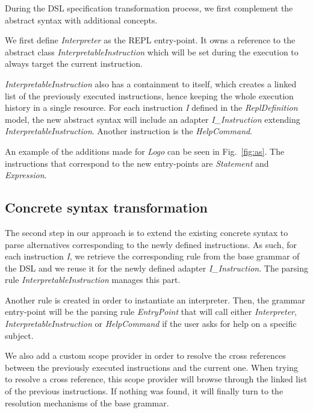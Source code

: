 During the DSL specification transformation process, we first complement the abstract syntax with additional concepts.

We first define \textit{Interpreter} as the REPL entry-point. It owns a reference to the abstract class \textit{InterpretableInstruction} which will be set during the execution to always target the current instruction.

\textit{InterpretableInstruction} also has a containment to itself, which creates a linked list of the previously executed instructions, hence keeping the whole execution history in a single resource.
For each instruction \textit{I} defined in the \emph{ReplDefinition} model, the new abstract syntax will include an adapter \textit{I\_Instruction} extending \textit{InterpretableInstruction}.
Another instruction is the \textit{HelpCommand}.

An example of the additions made for \textit{Logo} can be seen in Fig.~\ref{fig:as}.
The instructions that correspond to the new entry-points are \textit{Statement} and \textit{Expression}.

\subsection{Concrete syntax transformation}

The second step in our approach is to extend the existing concrete syntax to parse alternatives corresponding to the newly defined instructions.
As such, for each instruction \textit{I}, we retrieve the corresponding rule from the base grammar of the DSL and we reuse it for the newly defined adapter \textit{I\_Instruction}.
The parsing rule \textit{InterpretableInstruction} manages this part.

Another rule is created in order to instantiate an interpreter.
Then, the grammar entry-point will be the parsing rule \textit{EntryPoint} that will call either \textit{Interpreter}, \textit{InterpretableInstruction} or \textit{HelpCommand} if the user asks for help on a specific subject.

We also add a custom scope provider in order to resolve the cross references between the previously executed instructions and the current one.
When trying to resolve a cross reference, this scope provider will browse through the linked list of the previous instructions.
If nothing was found, it will finally turn to the resolution mechanisms of the base grammar.

